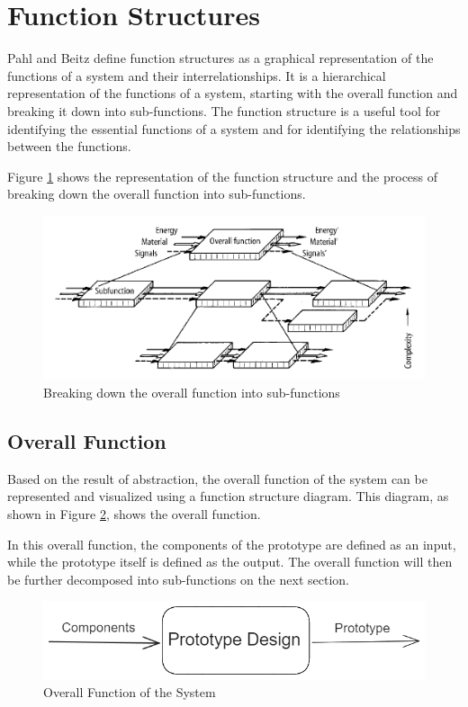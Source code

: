 \section{Function Structures}
Pahl and Beitz \cite{Pahl07e} define function structures as a graphical representation of the functions of a system and their interrelationships. It is a hierarchical representation of the functions of a system, starting with the overall function and breaking it down into sub-functions. The function structure is a useful tool for identifying the essential functions of a system and for identifying the relationships between the functions.

Figure \ref{fig:subfunction-break} shows the representation of the function structure and the process of breaking down the overall function into sub-functions.

\begin{figure}[ht!]
    \centering
    \includegraphics[width=0.8\linewidth]{texs/Part1/chapter3/image/subfunctionbreak.png}
    \caption{Breaking down the overall function into sub-functions \cite{Pahl07q}}
    \label{fig:subfunction-break}
\end{figure}


\subsection{Overall Function}
Based on the result of abstraction, the overall function of the system can be represented and visualized using a function structure diagram. This diagram, as shown in Figure \ref{fig:overall-function}, shows the overall function.

In this overall function, the components of the prototype are defined as an input, while the prototype itself is defined as the output. The overall function will then be further decomposed into sub-functions on the next section.

\begin{figure}[ht!]
    \centering
    \includegraphics[width=0.5\linewidth]{texs/Part1/chapter3/image/overallfunction.png}
    \caption{Overall Function of the System}
    \label{fig:overall-function}
\end{figure}


